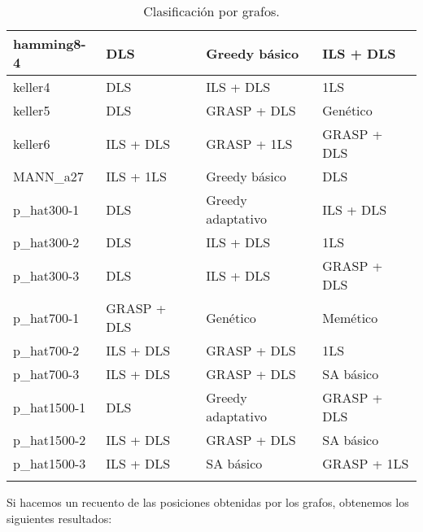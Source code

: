 \begin{small}
\begin{longtable}{l l l l}
    hamming8-4         & DLS & Greedy básico & ILS + DLS  \\  \hline
    keller4            & DLS & ILS + DLS & 1LS  \\  \hline
    keller5            & DLS & GRASP + DLS & Genético  \\  \hline
    keller6            & ILS + DLS & GRASP + 1LS & GRASP + DLS  \\  \hline
    MANN\_a27          & ILS + 1LS & Greedy básico & DLS  \\  \hline
    p\_hat300-1        & DLS & Greedy adaptativo & ILS + DLS  \\  \hline
    p\_hat300-2        & DLS & ILS + DLS & 1LS  \\  \hline
    p\_hat300-3        & DLS & ILS + DLS & GRASP + DLS  \\  \hline
    p\_hat700-1        & GRASP + DLS & Genético & Memético  \\  \hline
    p\_hat700-2        & ILS + DLS & GRASP + DLS & 1LS  \\  \hline
    p\_hat700-3        & ILS + DLS & GRASP + DLS & SA básico  \\  \hline
    p\_hat1500-1       & DLS & Greedy adaptativo & GRASP + DLS  \\  \hline
    p\_hat1500-2       & ILS + DLS & GRASP + DLS & SA básico  \\  \hline
    p\_hat1500-3       & ILS + DLS & SA básico & GRASP + 1LS  \\  \hline
  \caption{Clasificación por grafos.}
\end{longtable}
\end{small}

Si hacemos un recuento de las posiciones obtenidas por los grafos, obtenemos los
siguientes resultados:

